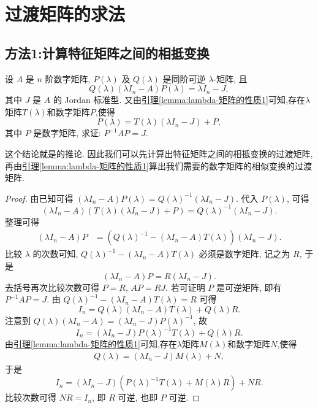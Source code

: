 \documentclass[../../main.tex]{subfiles}%
\begin{document}
\section{过渡矩阵的求法}\label{section:过渡矩阵的求法}

\subsection{方法1:计算特征矩阵之间的相抵变换}

\begin{corollary}\label{proposition:两个数字矩阵相似当且仅当它们的特征矩阵作为}
设 $A$ 是 $n$ 阶数字矩阵, $P(\lambda)$ 及 $Q(\lambda)$ 是同阶可逆 $\lambda$-矩阵, 且
\[
Q(\lambda)(\lambda I_n - A)P(\lambda) = \lambda I_n - J,
\]
其中 $J$ 是 $A$ 的 Jordan 标准型. 又由\hyperref[lemma:lambda-矩阵的性质1]{引理\ref{lemma:lambda-矩阵的性质1}}可知,存在$\lambda$矩阵$T(\lambda)$和数字矩阵$P$,使得
\[
P(\lambda) = T(\lambda)(\lambda I_n - J) + P,
\]
其中 $P$ 是数字矩阵, 求证: $P^{-1}AP = J$.
\end{corollary}
\begin{remark}
这个结论就是的推论. 因此我们可以先计算出特征矩阵之间的相抵变换的过渡矩阵,再由\hyperref[lemma:lambda-矩阵的性质1]{引理\ref{lemma:lambda-矩阵的性质1}}算出我们需要的数字矩阵的相似变换的过渡矩阵.
\end{remark}
\begin{proof}

由已知可得 $(\lambda I_n - A)P(\lambda) = Q(\lambda)^{-1}(\lambda I_n - J)$. 代入 $P(\lambda)$, 可得
\[
(\lambda I_n - A)(T(\lambda)(\lambda I_n - J) + P) = Q(\lambda)^{-1}(\lambda I_n - J).
\]
整理可得
\begin{align*}
(\lambda I_n - A)P &= \left(Q(\lambda)^{-1} - (\lambda I_n - A)T(\lambda)\right)(\lambda I_n - J).
\end{align*}
比较 $\lambda$ 的次数可知, $Q(\lambda)^{-1} - (\lambda I_n - A)T(\lambda)$ 必须是数字矩阵, 记之为 $R$, 于是
\[
(\lambda I_n - A)P = R(\lambda I_n - J).
\]
去括号再次比较次数可得 $P = R$, $AP = RJ$. 若可证明 $P$ 是可逆矩阵, 即有 $P^{-1}AP = J$. 由 $Q(\lambda)^{-1} - (\lambda I_n - A)T(\lambda) = R$ 可得
\[
I_n = Q(\lambda)(\lambda I_n - A)T(\lambda) + Q(\lambda)R.
\]
注意到 $Q(\lambda)(\lambda I_n - A) = (\lambda I_n - J)P(\lambda)^{-1}$, 故
\[
I_n = (\lambda I_n - J)P(\lambda)^{-1}T(\lambda) + Q(\lambda)R.
\]
由\hyperref[lemma:lambda-矩阵的性质1]{引理\ref{lemma:lambda-矩阵的性质1}}可知,存在$\lambda$矩阵$M(\lambda)$和数字矩阵$N$,使得
\begin{align*}
Q(\lambda) = (\lambda I_n - J)M(\lambda) + N,
\end{align*}
于是
\[
I_n = (\lambda I_n - J)\left(P(\lambda)^{-1}T(\lambda) + M(\lambda)R\right) + NR.
\]
比较次数可得 $NR = I_n$, 即 $R$ 可逆, 也即 $P$ 可逆. 

\end{proof}
\end{document}
